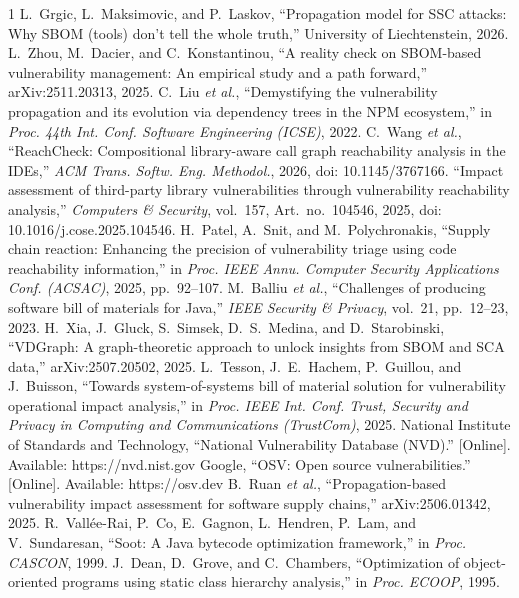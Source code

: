 \documentclass[conference]{IEEEtran}
\begin{document}
\begin{thebibliography}{1}
 L.~Grgic, L.~Maksimovic, and P.~Laskov, ``Propagation model for SSC attacks: Why SBOM (tools) don't tell the whole truth,'' University of Liechtenstein, 2026.
 L.~Zhou, M.~Dacier, and C.~Konstantinou, ``A reality check on SBOM-based vulnerability management: An empirical study and a path forward,'' arXiv:2511.20313, 2025.
 C.~Liu \emph{et al.}, ``Demystifying the vulnerability propagation and its evolution via dependency trees in the NPM ecosystem,'' in \emph{Proc. 44th Int. Conf. Software Engineering (ICSE)}, 2022.
 C.~Wang \emph{et al.}, ``ReachCheck: Compositional library-aware call graph reachability analysis in the IDEs,'' \emph{ACM Trans. Softw. Eng. Methodol.}, 2026, doi: 10.1145/3767166.
 ``Impact assessment of third-party library vulnerabilities through vulnerability reachability analysis,'' \emph{Computers \& Security}, vol.~157, Art.~no.~104546, 2025, doi: 10.1016/j.cose.2025.104546.
 H.~Patel, A.~Snit, and M.~Polychronakis, ``Supply chain reaction: Enhancing the precision of vulnerability triage using code reachability information,'' in \emph{Proc. IEEE Annu. Computer Security Applications Conf. (ACSAC)}, 2025, pp.~92--107.
 M.~Balliu \emph{et al.}, ``Challenges of producing software bill of materials for Java,'' \emph{IEEE Security \& Privacy}, vol.~21, pp.~12--23, 2023.
 H.~Xia, J.~Gluck, S.~Simsek, D.~S.~Medina, and D.~Starobinski, ``VDGraph: A graph-theoretic approach to unlock insights from SBOM and SCA data,'' arXiv:2507.20502, 2025.
 L.~Tesson, J.~E.~Hachem, P.~Guillou, and J.~Buisson, ``Towards system-of-systems bill of material solution for vulnerability operational impact analysis,'' in \emph{Proc. IEEE Int. Conf. Trust, Security and Privacy in Computing and Communications (TrustCom)}, 2025.
 National Institute of Standards and Technology, ``National Vulnerability Database (NVD).'' [Online]. Available: https://nvd.nist.gov
 Google, ``OSV: Open source vulnerabilities.'' [Online]. Available: https://osv.dev
 B.~Ruan \emph{et al.}, ``Propagation-based vulnerability impact assessment for software supply chains,'' arXiv:2506.01342, 2025.
 R.~Vall\'ee-Rai, P.~Co, E.~Gagnon, L.~Hendren, P.~Lam, and V.~Sundaresan, ``Soot: A Java bytecode optimization framework,'' in \emph{Proc. CASCON}, 1999.
 J.~Dean, D.~Grove, and C.~Chambers, ``Optimization of object-oriented programs using static class hierarchy analysis,'' in \emph{Proc. ECOOP}, 1995.

\end{thebibliography}
\end{document}
